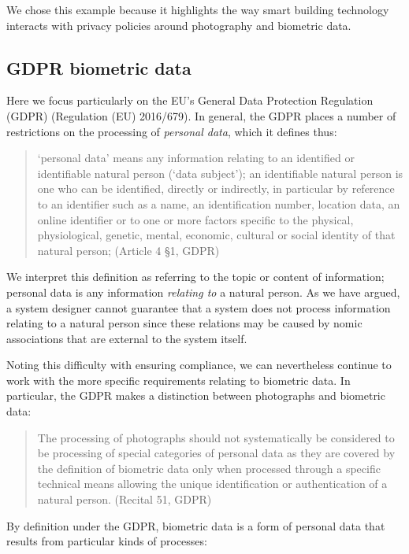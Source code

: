 \documentclass[../thesis.tex]{subfiles}
\begin{document}
We chose this example because it highlights the way smart building
technology interacts with privacy policies around photography
and biometric data.

\subsection{GDPR biometric data}

Here we focus particularly on the EU's General Data Protection
Regulation (GDPR) (Regulation (EU) 2016/679).
In general, the GDPR places a number of restrictions on
the processing of \emph{personal data}, which it defines
thus:

\begin{quote}
  `personal data' means any information relating to
  an identified or identifiable natural person (`data subject');
  an identifiable natural person is one who can be
  identified, directly or indirectly, in particular
  by reference to an identifier such as a name,
  an identification number, location data,
  an online identifier or to one or more factors specific
  to the physical, physiological, genetic, mental,
  economic, cultural or social identity of that natural person;
  (Article 4 \S 1, GDPR)
\end{quote}

We interpret this definition as referring to the
topic or content of information; personal data is
any information \emph{relating to} a natural person.
As we have argued, a system designer cannot guarantee
that a system does not process information relating
to a natural person since these relations may be
caused by nomic associations that are external to the
system itself.

Noting this difficulty with ensuring compliance, we
can nevertheless continue to work with the more
specific requirements relating to biometric data.
In particular, the  GDPR makes a distinction between
photographs and biometric data:

\begin{quote}
The processing of photographs should not systematically 
be considered to be processing of special categories of personal 
data as they are covered by the definition of biometric data 
only when processed through a specific technical means 
allowing the unique identification or authentication 
of a natural person. (Recital 51, GDPR)
\end{quote}

By definition under the GDPR, biometric data is a form of personal
data that results from particular kinds of processes:
\end{document}
